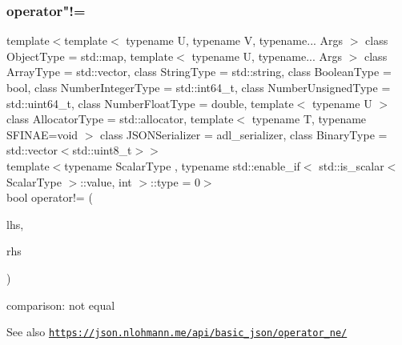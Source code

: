 \subsubsection{\texorpdfstring{operator"!=}{operator!=}\hspace{0.1cm}{\footnotesize\ttfamily [3/3]}}
{\footnotesize\ttfamily template$<$template$<$ typename U, typename V, typename... Args $>$ class Object\+Type = std\+::map, template$<$ typename U, typename... Args $>$ class Array\+Type = std\+::vector, class String\+Type  = std\+::string, class Boolean\+Type  = bool, class Number\+Integer\+Type  = std\+::int64\+\_\+t, class Number\+Unsigned\+Type  = std\+::uint64\+\_\+t, class Number\+Float\+Type  = double, template$<$ typename U $>$ class Allocator\+Type = std\+::allocator, template$<$ typename T, typename S\+F\+I\+N\+A\+E=void $>$ class J\+S\+O\+N\+Serializer = adl\+\_\+serializer, class Binary\+Type  = std\+::vector$<$std\+::uint8\+\_\+t$>$$>$ \\
template$<$typename Scalar\+Type , typename std\+::enable\+\_\+if$<$ std\+::is\+\_\+scalar$<$ Scalar\+Type $>$\+::value, int $>$\+::type  = 0$>$ \\
bool operator!= (\begin{DoxyParamCaption}\item[{Scalar\+Type}]{lhs,  }\item[{\hyperlink{classnlohmann_1_1basic__json_ab8a1c33ee7b154fc41ca2545aa9724e6}{const\+\_\+reference}}]{rhs }\end{DoxyParamCaption})\hspace{0.3cm}{\ttfamily [friend]}}



comparison\+: not equal 

\begin{DoxySeeAlso}{See also}
\href{https://json.nlohmann.me/api/basic_json/operator_ne/}{\tt https\+://json.\+nlohmann.\+me/api/basic\+\_\+json/operator\+\_\+ne/} 
\end{DoxySeeAlso}
\mbox{\label{classnlohmann_1_1basic__json_aacd442b66140c764c594ac8ad7dfd5b3}} 
